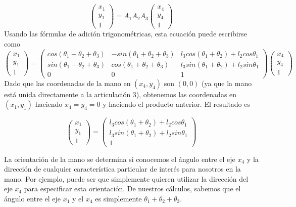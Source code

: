 \[
\begin{pmatrix} 
x_{1} \\ 
y_{1} \\
1
\end{pmatrix} = A_{1}A_{2}A_{3}
\begin{pmatrix} 
x_{4} \\ 
y_{4} \\
1
\end{pmatrix}
\]
Usando las fórmulas de adición trigonométricas, esta ecuación puede escribirse como
{\small\[
\begin{pmatrix} 
x_{1} \\ 
y_{1} \\
1
\end{pmatrix} = 
\begin{pmatrix} 
cos(\theta_{1}+\theta_{2}+\theta_{3}) & -sin(\theta_{1}+\theta_{2}+\theta_{3}) & l_{3}cos(\theta_{1} + \theta_{2})+l_{2}cos\theta_{1}\\
sin(\theta_{1}+\theta_{2}+\theta_{3}) & cos(\theta_{1}+\theta_{2}+\theta_{3}) & l_{3}sin(\theta_{1} + \theta_{2})+l_{2}sin\theta_{1}\\
0&0&1
\end{pmatrix}
\begin{pmatrix} 
x_{4} \\ 
y_{4} \\
1
\end{pmatrix}
\]}
Dado que las coordenadas de la mano en $(x_{4},y_{4})$ son $(0,0)$ (ya que la mano está unida directamente a la articulación 3), obtenemos las coordenadas en $(x_{1},y_{1})$ haciendo $x_{4} = y_{4} = 0$ y haciendo el producto anterior. El resultado es

\[
\begin{pmatrix} 
x_{1} \\ 
y_{1} \\
1
\end{pmatrix} = 
\begin{pmatrix} 
l_{3}cos(\theta_{1} + \theta_{2})+l_{2}cos\theta_{1}\\
l_{3}sin(\theta_{1} + \theta_{2})+l_{2}sin\theta_{1}\\
1
\end{pmatrix}
\]

La orientación de la mano se determina si conocemos el ángulo entre el eje $x_{4}$ y la dirección de cualquier característica particular de interés para nosotros en la mano. Por ejemplo, puede ser que simplemente quieren utilizar la dirección del eje $x_{4}$ para especificar esta orientación.
De nuestros cálculos, sabemos que el ángulo entre el eje $x_{1}$ y el $x_{4}$ es simplemente $\theta_{1} + \theta_{2} + \theta_{3}$.


